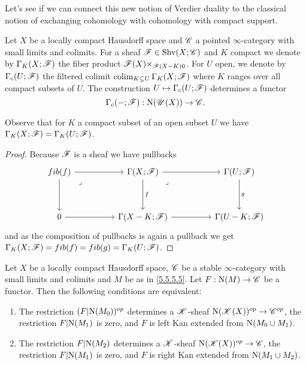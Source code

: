 \documentclass[../thesis.tex]{subfiles}
\begin{document}
Let's see if we can connect this new notion of Verdier duality to the classical notion of exchanging cohomology with cohomology with compact support.
\begin{definition}[{\cite[Definition 5.5.5.9]{HA}}]
    Let $X$ be a locally compact Hausdorff space and $\mathscr{C}$ a pointed $\infty$-category with small limits and colimits.
    For a sheaf $\mathscr{F} \in \mathrm{Shv}(X;\mathscr{C})$ and $K$ compact we denote by $\Gamma_K(X;\mathscr{F})$ the fiber product $\mathscr{F}(X)\times_{\mathscr{F}(X-K)0}$.
    For $U$ open, we denote by $\Gamma_c(U;\mathscr{F})$ the filtered colimit $\operatorname{colim}_{K\subseteq U}\Gamma_K(X;\mathscr{F})$ where $K$ ranges over all compact subsets of $U$.
    The construction $U \mapsto \Gamma_c(U;\mathscr{F})$ determines a functor
    \[
        \Gamma_c({-} ;\mathscr{F}) : \mathrm{N}(\mathscr{U}(X)) \to \mathscr{C} .
    \]
\end{definition}
\begin{remark}\label{GammaKXisGammaKU}
    Observe that for $K$ a compact subset of an open subset $U$ we have $\Gamma_K(X;\mathscr{F}) = \Gamma_K(U;\mathscr{F})$.
\end{remark}
\begin{proof}
    Because $\mathscr{F}$ is a sheaf we have pullbacks
    \[\begin{tikzcd}
            {fib(f)} && {\Gamma(X;\F)} && {\Gamma(U;\F)} \\
            \\
            0 && {\Gamma(X-K;\F)} && {\Gamma(U-K;\F)}
            \arrow[from=1-3, to=1-5]
            \arrow["f", from=1-3, to=3-3]
            \arrow[from=3-3, to=3-5]
            \arrow["g", from=1-5, to=3-5]
            \arrow["\lrcorner"{anchor=center, pos=0.125}, draw=none, from=1-3, to=3-5]
            \arrow[from=1-1, to=3-1]
            \arrow[from=3-1, to=3-3]
            \arrow[from=1-1, to=1-3]
            \arrow["\lrcorner"{anchor=center, pos=0.125}, draw=none, from=1-1, to=3-3]
        \end{tikzcd}\]
    and as the composition of pullbacks is again a pullback we get $\Gamma_K(X;\mathscr{F})=fib(f)=fib(g)=\Gamma_K(U;\mathscr{F})$.
\end{proof}
\begin{lemma}[{\cite[Proposition 5.5.5.7]{HA}}]
    Let $X$ be a locally compact Hausdorff space, $\mathscr{C}$ be a stable $\infty$-category with small limits and colimits and $M$ be as in \ref{5.5.5.5}.
    Let $F : \mathrm{N}(M) \to \mathscr{C}$ be a functor.
    Then the following conditions are equivalent:
    \begin{enumerate}
        \item The restriction $(F|\mathrm{N}(M_0))^{op}$ determines a $\mathscr{K}$-sheaf $\mathrm{N}(\mathscr{K}(X))^{op} \to \mathscr{C}^{op}$, the restriction $F|\mathrm{N}(M_1)$ is zero, and $F$ is left Kan extended from $\mathrm{N}(M_0 \cup M_1)$.
        \item The restriction $F|\mathrm{N}(M_2)$ determines a $\mathscr{K}$-sheaf $\mathrm{N}(\mathscr{K}(X))^{op} \to \mathscr{C}$, the restriction $F|\mathrm{N}(M_1)$ is zero, and $F$ is right Kan extended from $\mathrm{N}(M_1 \cup M_2)$.
    \end{enumerate}
\end{lemma}
\end{document}
